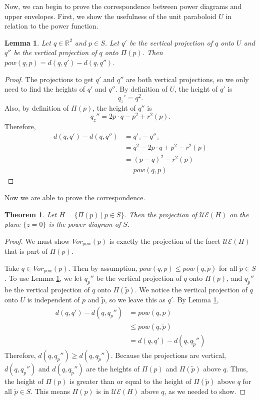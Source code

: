 \documentclass[a4paper, 11pt]{article}
\newtheorem{theorem}{Theorem}[section]
\newtheorem{lemma}{Lemma}[section]
\newcommand{\R}{\mathbb{R}}
\begin{document}
Now, we can begin to prove the correspondence between power diagrams and upper envelopes. First, we show the usefulness of the unit paraboloid $U$ in
relation to the power function.

\begin{lemma}
  \label{lem:proj}
  Let $q \in \R^2$ and $p \in S$. Let $q'$ be the vertical projection of $q$ onto $U$ and $q''$ be the vertical projection of $q$ onto $\Pi(p)$. Then
  $pow(q, p) = d(q, q') - d(q, q'')$.
\end{lemma}
\begin{proof}
  The projections to get $q'$ and $q''$ are both vertical projections, so we only need to find the heights of $q'$ and $q''$. By
  definition of $U$, the height of $q'$ is
  \[ q_z' = q^2.\]
  Also, by definition of $\Pi(p)$, the height of $q''$ is
  \[ q_z'' = 2p \cdot q - p^2 + r^2(p) . \]
  Therefore,
  \begin{align*}
    d(q,q') - d(q,q'') &= q'_z - q''_z \\
    &= q^2 - 2 p \cdot q + p^2 - r^2(p) \\
    &= (p-q)^2 - r^2(p) \\
    &= pow(q,p)
  \end{align*}
\end{proof}

Now we are able to prove the correspondence.

\begin{theorem}
  Let $H = \{ \Pi(p) \ | \ p \in S \}$. Then the projection of $\mathcal{UE}(H)$ on the plane $\{ z=0 \}$ is the power diagram of $S$.
  \label{thm:ue_to_pow}
\end{theorem}
\begin{proof}
  We must show $Vor_{pow}(p)$ is exactly the projection of the facet $\mathcal{UE}(H)$ that is part of $\Pi(p)$.

  Take $q \in Vor_{pow}(p)$. Then by assumption, $pow(q,p) \leq pow(q,\tilde{p})$ for all $\tilde{p} \in S$. To use Lemma \ref{lem:proj}, we let $q_p''$ be the
  vertical projection of $q$ onto $\Pi(p)$, and $q_{\tilde{p}}''$ be the vertical projection of $q$ onto $\Pi(\tilde{p})$. We notice the vertical projection
  of $q$ onto $U$ is independent of $p$ and $\tilde{p}$, so we leave this as $q'$. By Lemma \ref{lem:proj},
  \begin{align*}
    d(q,q') - d(q,q_p'') &= pow(q,p) \\
    &\leq pow(q,\tilde{p}) \\
    &= d(q,q') - d(q,q_{\tilde{p}}'')
  \end{align*}
  Therefore, $d(q,q_p'') \geq d(q, q_{\tilde{p}}'')$. Because the projections are vertical, $d(q,q_p'')$ and $d(q, q_{\tilde{p}}'')$ are the heights of
  $\Pi(p)$ and $\Pi(\tilde{p})$ above $q$. Thus, the height of $\Pi(p)$ is greater than or equal to the height of $\Pi(\tilde{p})$ above $q$ for all
  $\tilde{p} \in S$. This means $\Pi(p)$ is in $\mathcal{UE}(H)$ above $q$, as we needed to show.
\end{proof}
\end{document}
